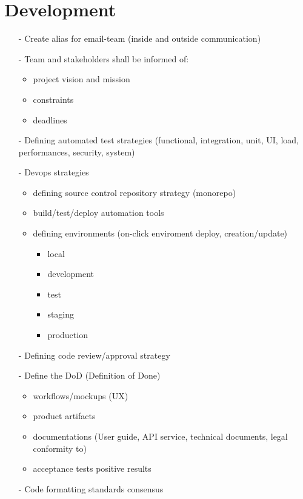 \documentclass[
	fontsize=10pt, %
	twoside=false, %
	secnumdepth=1, %
]{kaobook}
\begin{document}
\chapter{Development}
	\begin{itemize}
		\item[-] Create alias for email-team (inside and outside communication)
		\item[-] Team and stakeholders shall be informed of:
			\begin{itemize}
				\item project vision and mission
				\item constraints
				\item deadlines
			\end{itemize}
		\item[-] Defining automated test strategies (functional, integration, unit, UI, load, performances, security, system)
		\item[-] Devops strategies
			\begin{itemize}
				\item defining source control repository strategy (monorepo)
				\item build/test/deploy automation tools
				\item defining environments (on-click enviroment deploy, creation/update)
					\begin{itemize}
						\item local
						\item development
						\item test
						\item staging
						\item production
					\end{itemize}
			\end{itemize}
		\item[-] Defining code review/approval strategy
		\item[-] Define the DoD (Definition of Done)
			\begin{itemize}
				\item workflows/mockups (UX)
				\item product artifacts
				\item documentations (User guide, API service, technical documents, legal conformity to)
				\item acceptance tests positive results
			\end{itemize}
		\item[-] Code formatting standards consensus
			\begin{itemize}

\end{itemize}
\end{itemize}
\end{document}
